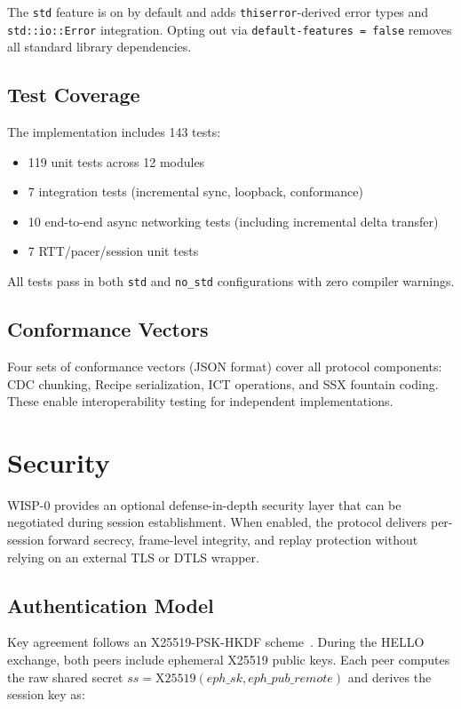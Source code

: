 \documentclass[11pt,twocolumn]{article}
\theoremstyle{definition}
\begin{document}
The \texttt{std} feature is on by default and adds
\texttt{thiserror}-derived error types and \texttt{std::io::Error}
integration. Opting out via \texttt{default-features = false} removes
all standard library dependencies.

\subsection{Test Coverage}

The implementation includes 143 tests:
\begin{itemize}
  \item 119 unit tests across 12 modules
  \item 7 integration tests (incremental sync, loopback, conformance)
  \item 10 end-to-end async networking tests (including incremental delta transfer)
  \item 7 RTT/pacer/session unit tests
\end{itemize}

All tests pass in both \texttt{std} and \texttt{no\_std} configurations
with zero compiler warnings.

\subsection{Conformance Vectors}

Four sets of conformance vectors (JSON format) cover all protocol
components: CDC chunking, Recipe serialization, ICT operations, and
SSX fountain coding. These enable interoperability testing for
independent implementations.


\section{Security}
\label{sec:security}

WISP-0 provides an optional defense-in-depth security layer that can be
negotiated during session establishment. When enabled, the protocol
delivers per-session forward secrecy, frame-level integrity, and replay
protection without relying on an external TLS or DTLS wrapper.

\subsection{Authentication Model}

Key agreement follows an X25519-PSK-HKDF scheme~\cite{rfc7748,rfc5869}.
During the HELLO exchange, both peers include ephemeral X25519 public keys.
Each peer computes the raw shared secret
$\mathit{ss} = \text{X25519}(\mathit{eph\_sk}, \mathit{eph\_pub\_remote})$
and derives the session key as:
\end{document}
